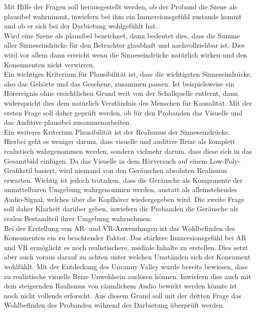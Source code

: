  Mit Hilfe der Fragen soll herausgestellt werden, ob der Proband die Szene als plausibel wahrnimmt, inwiefern bei ihm ein Immersionsgefühl zustande kommt und ob er sich bei der Darbietung wohlgefühlt hat. \\
 
 Wird eine Szene als plausibel bezeichnet, dann bedeutet dies, dass die Summe aller Sinneseindrücke für den Betrachter glaubhaft und nachvollziehbar ist. Dies wird vor allem dann erreicht wenn die Sinneseindrücke natürlich wirken und den Konsumenten nicht verwirren. \\
 
 Ein wichtiges Kriterium für Plausibilität ist, dass die wichtigsten Sinneseindrücke, also das Gehörte und das Gesehene, zusammen passen. Ist beispielsweise ein Hörereignis ohne ersichtlichen Grund weit von der Schallquelle entfernt, dann widerspricht dies dem natürlich Verständnis des Menschen für Kausalität. Mit der ersten Frage soll daher geprüft werden, ob für den Probanden das Visuelle und das Auditive plausibel zusammenarbeiten.\\
 
 Ein weiteres Kriterium Plausibilität ist der Realismus der Sinneseindrücke. Hierbei geht es weniger darum, dass visuelle und auditive Reize als komplett realistisch wahrgenommen werden, sondern vielmehr darum, dass diese sich in das Gesamtbild einfügen. Da das Visuelle in dem Hörversuch auf einem Low-Poly-Grafikstil basiert, wird niemand von den Geräuschen absoluten Realismus erwarten. Wichtig ist jedoch trotzdem, dass die Geräusche als Komponente der unmittelbaren Umgebung wahrgenommen werden, anstatt als alleinstehendes Audio-Signal, welches über die Kopfhörer wiedergegeben wird. Die zweite Frage soll daher Klarheit darüber geben, inwiefern die Probanden die Geräusche als realen Bestandteil ihrer Umgebung wahrnehmen. \\
 
Bei der Erstellung von AR- und VR-Anwendungen ist das Wohlbefinden des Konsumenten  ein zu beachtender Faktor. Das stärkere Immersionsgefühl bei AR und VR ermöglicht es noch realistischere, mediale Inhalte zu erstellen. Dies setzt aber auch voraus darauf zu achten unter welchen Umständen sich der Konsument wohlfühlt. Mit der Entdeckung des Uncanny Valley wurde bereits bewiesen, dass zu realistische visuelle Reize Unwohlsein auslösen können. Inwiefern dies auch mit dem steigernden Realismus von räumlichem Audio bewirkt werden könnte ist noch nicht vollends erforscht. Aus diesem Grund soll mit der dritten Frage das Wohlbefinden des Probanden während der Darbietung überprüft werden. 
 
